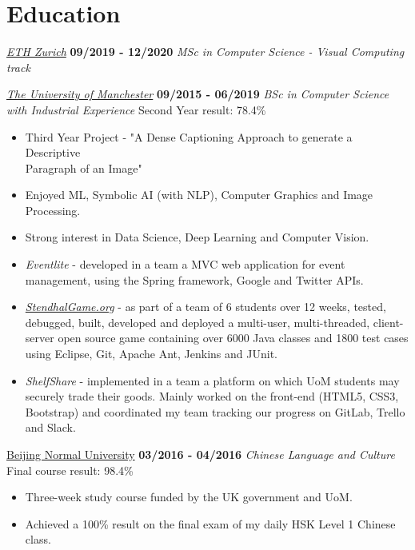 \documentclass[]{friggeri-cv}
\begin{document}
\section{\color{red}Education}
\begin{entrylist}
    \entry
    {}
    {\emph{\href{https://inf.ethz.ch/studies/master/master-cs.html}{ETH Zurich}}}
    {\textbf{09/2019 - 12/2020}}
    {\emph{MSc in Computer Science - Visual Computing track}}

  \entry
    {}
    {\emph{\href{http://www.manchester.ac.uk/}{The University of Manchester}}}
    {\textbf{09/2015 - 06/2019}}
    {\emph{BSc in Computer Science with Industrial Experience}}
    {Second Year result: 78.4\%}
    \begin{itemize}
        \item Third Year Project - "A Dense Captioning Approach to generate a Descriptive \\Paragraph of an Image"
        \item Enjoyed ML, Symbolic AI (with NLP), Computer Graphics and Image Processing.
        \item Strong interest in Data Science, Deep Learning and Computer Vision.
        \item \emph{Eventlite} - developed in a team a MVC web application for event management, using the Spring framework, Google and Twitter APIs.
        \item \emph{\href{https://stendhalgame.org/}{StendhalGame.org}} - as part of a team of 6 students over 12 weeks, tested, debugged, built, developed and deployed a multi-user, multi-threaded, client-server open source game containing over 6000 Java classes and 1800 test cases using Eclipse, Git, Apache Ant, Jenkins and JUnit.
        \item \emph{ShelfShare} - implemented in a team a platform on which UoM students may securely trade their goods. Mainly worked on the front-end (HTML5, CSS3, Bootstrap) and coordinated my team tracking our progress on GitLab, Trello and Slack.\\
    \end{itemize}
  \entry
    {}
    {\href{http://english.bnu.edu.cn/}{Beijing Normal University}}
    {\textbf{03/2016 - 04/2016}}
    {\emph{Chinese Language and Culture}}
    {Final course result: 98.4\%}
    \begin{itemize}
        \item Three-week study course funded by the UK government and UoM.
        \item Achieved a 100\% result on the final exam of my daily HSK Level 1 Chinese class.\\

\end{itemize}
\end{entrylist}
\end{document}
